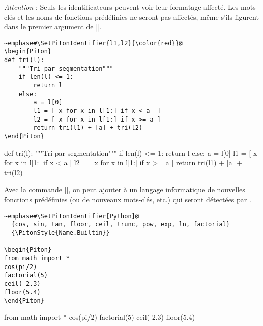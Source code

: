 \documentclass[dvipsnames,svgnames]{article}
\begin{document}
\emph{Attention} : Seuls les identificateurs peuvent voir leur formatage affecté. Les mots-clés et les noms de
fonctions prédéfinies ne seront pas affectés, même s'ils figurent dans le premier argument de
|\SetPitonIdentifier|. 

\begin{Verbatim}
~emphase#\SetPitonIdentifier{l1,l2}{\color{red}}@
\begin{Piton}
def tri(l):
    """Tri par segmentation"""
    if len(l) <= 1:
        return l
    else:
        a = l[0]
        l1 = [ x for x in l[1:] if x < a  ]
        l2 = [ x for x in l[1:] if x >= a ]
        return tri(l1) + [a] + tri(l2)
\end{Piton}
\end{Verbatim}


\bigskip

\begingroup


\begin{Piton}
def tri(l):
    """Tri par segmentation"""
    if len(l) <= 1:
        return l
    else:
        a = l[0]
        l1 = [ x for x in l[1:] if x < a  ]
        l2 = [ x for x in l[1:] if x >= a ]
        return tri(l1) + [a] + tri(l2)
\end{Piton}

\endgroup

\bigskip
Avec la commande |\SetPitonIdentifiers|, on peut ajouter à un langage informatique de nouvelles fonctions
prédéfinies (ou de nouveaux mots-clés, etc.) qui seront détectées par .


\begin{Verbatim}
~emphase#\SetPitonIdentifier[Python]@
  {cos, sin, tan, floor, ceil, trunc, pow, exp, ln, factorial}
  {\PitonStyle{Name.Builtin}}

\begin{Piton}
from math import *
cos(pi/2) 
factorial(5)
ceil(-2.3) 
floor(5.4) 
\end{Piton}
\end{Verbatim}

\begingroup

  {}
 
\begin{Piton}
from math import *
cos(pi/2) 
factorial(5)
ceil(-2.3) 
floor(5.4) 
\end{Piton}


\endgroup
\end{document}
